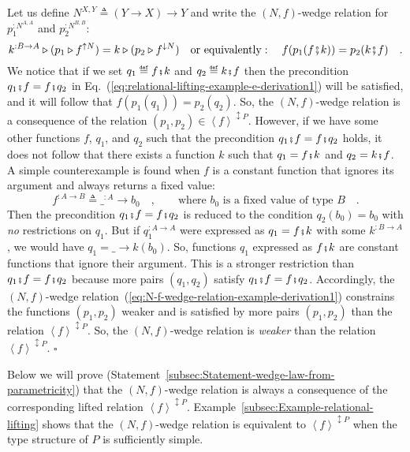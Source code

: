Let us define $N^{X,Y}\triangleq\left(Y\rightarrow X\right)\rightarrow Y$
and write the $\left(N,f\right)$-wedge relation for $p_{1}^{:N^{A,A}}$
and $p_{2}^{:N^{B,B}}$:
\begin{equation}
k^{:B\rightarrow A}\triangleright(p_{1}\triangleright f^{\uparrow N})=k\triangleright(p_{2}\triangleright f^{\downarrow N})\quad\text{or equivalently}:\quad f(p_{1}(f\bef k))=p_{2}(k\bef f)\quad.\label{eq:N-f-wedge-relation-example-derivation1}
\end{equation}
We notice that if we set $q_{1}\triangleq f\bef k$ and $q_{2}\triangleq k\bef f$
then the precondition $q_{1}\bef f=f\bef q_{2}$ in Eq.~(\ref{eq:relational-lifting-example-e-derivation1})
will be satisfied, and it will follow that $f(p_{1}(q_{1}))=p_{2}(q_{2})$.
So, the $\left(N,f\right)$-wedge relation is a consequence of the
relation $(p_{1},p_{2})\in\left<f\right>^{\updownarrow P}$. However,
if we have some other functions $f$, $q_{1}$, and $q_{2}$ such
that the precondition $q_{1}\bef f=f\bef q_{2}$ holds, it does not
follow that there exists a function $k$ such that $q_{1}=f\bef k$
and $q_{2}=k\bef f$. A simple counterexample is found when $f$ is
a constant function that ignores its argument and always returns a
fixed value:
\[
f^{:A\rightarrow B}\triangleq\_^{:A}\rightarrow b_{0}\quad,\quad\quad\text{where }b_{0}\text{ is a fixed value of type }B\quad.
\]
Then the precondition $q_{1}\bef f=f\bef q_{2}$ is reduced to the
condition $q_{2}(b_{0})=b_{0}$ with \emph{no} restrictions on $q_{1}$.
But if $q_{1}^{:A\rightarrow A}$ were expressed as $q_{1}=f\bef k$
with some $k^{:B\rightarrow A}$, we would have $q_{1}=\_\rightarrow k(b_{0})$.
So, functions $q_{1}$ expressed as $f\bef k$ are constant functions
that ignore their argument. This is a stronger restriction than $q_{1}\bef f=f\bef q_{2}$
because more pairs $\left(q_{1},q_{2}\right)$ satisfy $q_{1}\bef f=f\bef q_{2}$.
Accordingly, the $\left(N,f\right)$-wedge relation~(\ref{eq:N-f-wedge-relation-example-derivation1})
constrains the functions $\left(p_{1},p_{2}\right)$ weaker and is
satisfied by more pairs $\left(p_{1},p_{2}\right)$ than the relation
$\left<f\right>^{\updownarrow P}$. So, the $\left(N,f\right)$-wedge
relation is\emph{ weaker} than the relation $\left<f\right>^{\updownarrow P}$.
$\square$

Below we will prove (Statement~\ref{subsec:Statement-wedge-law-from-parametricity})
that the $\left(N,f\right)$-wedge relation is always a consequence
of the corresponding lifted relation $\left<f\right>^{\updownarrow P}$.
Example~\ref{subsec:Example-relational-lifting} shows that the $\left(N,f\right)$-wedge
relation is equivalent to $\left<f\right>^{\updownarrow P}$ when
the type structure of $P$ is sufficiently simple.

